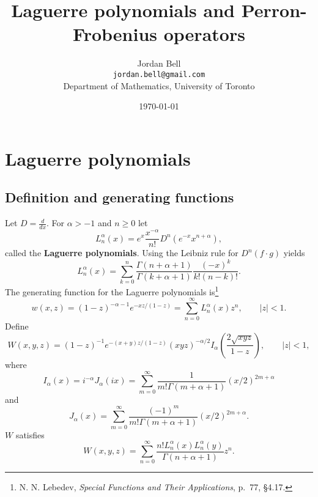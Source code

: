 \documentclass{article}
\theoremstyle{definition}
\begin{document}
\title{Laguerre polynomials and Perron-Frobenius operators}
\author{Jordan Bell\\ \texttt{jordan.bell@gmail.com}\\Department of Mathematics, University of Toronto}
\date{\today}

\maketitle

\section{Laguerre polynomials}
\subsection{Definition and generating functions}
Let $D=\frac{d}{dx}$. For $\alpha>-1$ and $n \geq 0$ let
\[
L_n^\alpha(x) = e^x \frac{x^{-\alpha}}{n!} D^n(e^{-x}x^{n+\alpha}),
\]
called the \textbf{Laguerre polynomials}.
Using the Leibniz rule for $D^n(f \cdot g)$ yields
\[
L_n^\alpha(x)=\sum_{k=0}^n \frac{\Gamma(n+\alpha+1)}{\Gamma(k+\alpha+1)} \frac{(-x)^k}{k!(n-k)!}.
\]
The generating function for the Laguerre polynomials is\footnote{N. N. Lebedev,
{\em Special Functions and Their Applications},
p.~77, \S 4.17.}
\[
w(x,z) = (1-z)^{-\alpha-1} e^{-xz/(1-z)} = \sum_{n=0}^\infty L_n^\alpha(x) z^n,\qquad
|z|<1.
\]
Define
\[
W(x,y,z) = (1-z)^{-1} e^{-(x+y)z/(1-z)} (xyz)^{-\alpha/2} I_\alpha \left( \frac{2 \sqrt{xyz}}{1-z} \right),
\qquad |z|<1,
\]
where 
\[
I_\alpha(x)=i^{-\alpha} J_\alpha(ix) = \sum_{m=0}^\infty \frac{1}{m! \Gamma(m+\alpha+1)} (x/2)^{2m+\alpha}
\]
and
\[
J_\alpha(x) = \sum_{m=0}^\infty \frac{(-1)^m}{m! \Gamma(m+\alpha+1)} (x/2)^{2m+\alpha}.
\]
$W$ satisfies
\[
W(x,y,z) = \sum_{n=0}^\infty 
\frac{n! L_n^\alpha(x) L_n^\alpha(y)}{\Gamma(n+\alpha+1)} z^n.
\]
\end{document}
